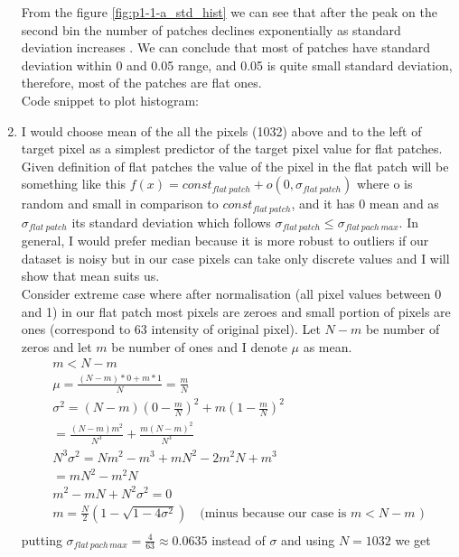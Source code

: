 \documentclass{article}
\begin{document}
\begin{enumerate}[label=(\alph*)]
				 	From the figure \ref{fig:p1-1-a_std_hist} we can see that after the peak on the second bin the number of patches declines exponentially as  standard deviation increases . We can conclude that most of patches have standard deviation within 0 and 0.05 range, and 0.05 is quite small standard deviation, therefore, most of the patches are flat ones. \\
				 	Code snippet to plot histogram:
				 	\newpage
				 	
				 	
				\item
					I would choose mean of the all the pixels (1032) above and to the left of target pixel as a simplest predictor of the target pixel value for flat patches. Given definition of flat patches the value of the pixel in the flat patch will be something like this $f(x) = const_{flat\ patch} + o(0, \sigma_{flat\ patch})$ where o is random and small in comparison to $const_{flat\ patch}$, and it has 0 mean and as $\sigma_{flat\ patch}$ its standard deviation which follows $\sigma_{flat \, patch} \leq \sigma_{flat \, pach \, max}$. In general, I would prefer median because it is more robust to outliers if our dataset is noisy but in our case pixels can take only discrete values and I will show that mean suits us.\\
					Consider extreme case where after normalisation (all pixel values between 0 and 1) in our flat patch  most pixels are zeroes and small portion of pixels are ones (correspond to 63 intensity of original pixel). Let $N-m$ be number of zeros and let $m$ be number of ones and I denote $\mu$ as mean. 
					\begin{gather*}
						m < N - m\\
						\mu = \frac{(N - m) * 0 + m * 1}{N} = \frac{m}{N}\\
						\sigma^2 = (N - m) (0 - \frac{m}{N})^2 + m(1 - \frac{m}{N})^2 \\
						= \frac{(N - m)m^2}{N^3} + \frac{m(N - m)^2}{N ^ 3}\\
						N^3\sigma^2 = Nm^2 - m^3 + mN^2 - 2m^2N + m^3 \\
						= mN^2-m^2N\\
						m^2 - mN + N^2\sigma^2 = 0\\
						m = \frac{N}{2}(1 - \sqrt{1 - 4 \sigma ^ 2})\quad\text{(minus because our case is $m < N - m$ )}\\
					\end{gather*}
					putting $\sigma_{flat \, pach \, max} = \frac{4}{63} \approx 0.0635$ instead of $\sigma$ and using $N = 1032$ we get

\end{enumerate}
\end{document}
